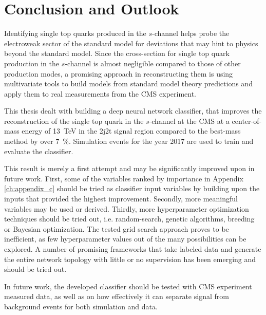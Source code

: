 \chapter{Conclusion and Outlook}
Identifying single top quarks produced in the $s$-channel helps probe the electroweak sector of the standard model for deviations that may hint to physics beyond the standard model. Since the cross-section for single top quark production in the $s$-channel is almost negligible compared to those of other production modes, a promising approach in reconstructing them is using multivariate tools to build models from standard model theory predictions and apply them to real measurements from the CMS experiment.

This thesis dealt with building a deep neural network classifier, that improves the reconstruction of the single top quark in the $s$-channel at the CMS at a center-of-mass energy of \SI{13}{TeV} in the 2j2t signal region compared to the best-mass method by over \SI{7}{\%}. Simulation events for the year 2017 are used to train and evaluate the classifier.

This result is merely a first attempt and may be significantly improved upon in future work. First, some of the variables ranked by importance in Appendix \ref{ch:appendix_c} should be tried as classifier input variables by building upon the inputs that provided the highest improvement. Secondly, more meaningful variables may be used or derived. Thirdly, more hyperparameter optimization techniques should be tried out, i.e. random-search, genetic algorithms, breeding or Bayesian optimization. The tested grid search approach proves to be inefficient, as few hyperparameter values out of the many possibilities can be explored. A number of promising frameworks that take labeled data and generate the entire network topology with little or no supervision has been emerging and should be tried out.

In future work, the developed classifier should be tested with CMS experiment measured data, as well as on how effectively it can separate signal from background events for both simulation and data.
